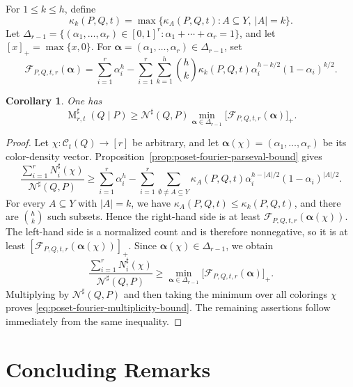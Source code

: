 \documentclass[twoside,12pt]{article}
\newtheorem{corollary}[theorem]{Corollary}
\begin{document}
For \(1\le k\le h\), define
$$\kappa_k(P,Q,t)=\max\{\kappa_A(P,Q,t):A\subseteq Y,\ |A|=k\}.$$ Let
\(\Delta_{r-1}=\{(\alpha_1,\ldots,\alpha_r)\in[0,1]^r:
\alpha_1+\cdots+\alpha_r=1\}\), and let \([x]_+=\max\{x,0\}\). For
\(\boldsymbol\alpha=(\alpha_1,\ldots,\alpha_r)\in\Delta_{r-1}\), set
$$
 \mathcal F_{P,Q,t,r}(\boldsymbol\alpha)
 =
 \sum_{i=1}^r\alpha_i^h
 -
 \sum_{i=1}^r\sum_{k=1}^h
 \binom hk\kappa_k(P,Q,t)
 \alpha_i^{h-k/2}(1-\alpha_i)^{k/2}.
$$

\begin{corollary}
\label{cor:poset-fourier-multiplicity-bound}
One has
\begin{equation}\label{eq:poset-fourier-multiplicity-bound}
 \operatorname M_{r,t}^{\sharp}(Q\mid P)
 \ge
 \mathcal N^{\sharp}(Q,P)
 \min_{\boldsymbol\alpha\in\Delta_{r-1}}
 \bigl[\mathcal F_{P,Q,t,r}(\boldsymbol\alpha)\bigr]_+.
\end{equation}
\end{corollary}

\begin{proof}
Let \(\chi:\mathcal C_t(Q)\to[r]\) be arbitrary, and let
\(\boldsymbol\alpha(\chi)=(\alpha_1,\ldots,\alpha_r)\) be its color-density
vector. Proposition~\ref{prop:poset-fourier-parseval-bound} gives
\[
 \frac{\sum_{i=1}^rN_i^\sharp(\chi)}{\mathcal N^\sharp(Q,P)}
 \ge
 \sum_{i=1}^r\alpha_i^h
 -
 \sum_{i=1}^r\sum_{\emptyset\ne A\subseteq Y}
 \kappa_A(P,Q,t)
 \alpha_i^{h-|A|/2}(1-\alpha_i)^{|A|/2}.
\]
For every \(A\subseteq Y\) with \(|A|=k\), we have
\(\kappa_A(P,Q,t)\le\kappa_k(P,Q,t)\), and there are \(\binom hk\) such
subsets. Hence the right-hand side is at least
\(\mathcal F_{P,Q,t,r}(\boldsymbol\alpha(\chi))\). The left-hand side is a
normalized count and is therefore nonnegative, so it is at least
\([\mathcal F_{P,Q,t,r}(\boldsymbol\alpha(\chi))]_+\). Since
\(\boldsymbol\alpha(\chi)\in\Delta_{r-1}\), we obtain
\[
 \frac{\sum_{i=1}^rN_i^\sharp(\chi)}{\mathcal N^\sharp(Q,P)}
 \ge
 \min_{\boldsymbol\alpha\in\Delta_{r-1}}
 \bigl[\mathcal F_{P,Q,t,r}(\boldsymbol\alpha)\bigr]_+.
\]
Multiplying by \(\mathcal N^\sharp(Q,P)\) and then taking the minimum over
all colorings \(\chi\) proves \eqref{eq:poset-fourier-multiplicity-bound}.
The remaining assertions follow immediately from the same inequality.
\end{proof}

\section{Concluding Remarks}
\end{document}
